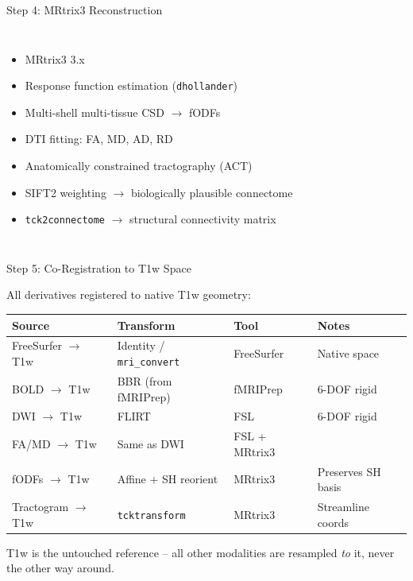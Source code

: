 \begin{frame}{Step 4: MRtrix3 Reconstruction}

  \begin{columns}[T]
    \begin{itemize}
      \item MRtrix3 3.x \cite{Tournier2019}
      \item Response function estimation (\texttt{dhollander})
      \item Multi-shell multi-tissue CSD $\to$ fODFs
      \item DTI fitting: FA, MD, AD, RD
      \item Anatomically constrained tractography (ACT)
      \item SIFT2 weighting $\to$ biologically plausible
        connectome
      \item \texttt{tck2connectome} $\to$ structural
        connectivity matrix
    \end{itemize}

    \begin{center}
    \end{center}
  \end{columns}

\end{frame}

\begin{frame}{Step 5: Co-Registration to T1w Space}

  All derivatives registered to native T1w geometry:

  \bigskip

  \begin{tabular}{llll}
    \toprule
    \textbf{Source} & \textbf{Transform} & \textbf{Tool} & \textbf{Notes} \\
    \midrule
    FreeSurfer $\to$ T1w & Identity / \texttt{mri\_convert} &
      FreeSurfer & Native space \\
    BOLD $\to$ T1w & BBR (from fMRIPrep) &
      fMRIPrep & 6-DOF rigid \\
    DWI $\to$ T1w & FLIRT & FSL & 6-DOF rigid \\
    FA/MD $\to$ T1w & Same as DWI & FSL + MRtrix3 & \\
    fODFs $\to$ T1w & Affine + SH reorient &
      MRtrix3 & Preserves SH basis \\
    Tractogram $\to$ T1w & \texttt{tcktransform} &
      MRtrix3 & Streamline coords \\
    \bottomrule
  \end{tabular}

  \bigskip

  T1w is the untouched reference -- all other modalities are
  resampled \emph{to} it, never the other way around.

\end{frame}

